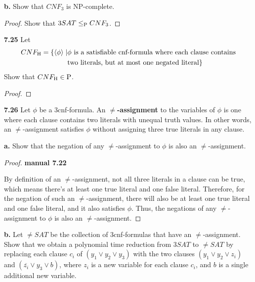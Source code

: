 \textbf{b.} Show that $CNF_3$ is NP-complete.
\begin{mdframed}
\begin{proof}
Show that $3SAT \leq_\P CNF_3$.
\end{proof}
\end{mdframed}

\textbf{7.25} Let 
\begin{align*}
CNF_\text{H} = \{ \desc{\phi} \mid & \phi \text{ is a satisfiable cnf-formula where each clause contains}  \\
& \text{two literals, but at most one negated literal}\}
\end{align*}
Show that $CNF_\text{H} \in \P$.

\begin{mdframed}
\begin{proof}

\end{proof}
\end{mdframed}

\label{lang:NEQSAT_NPC}
\textbf{7.26} Let $\phi$ be a 3cnf-formula. An \textbf{$\neq$-assignment} to the variables of $\phi$ is one where each clause contains two literals with unequal truth values. In other words, an $\neq$-assignment satisfies $\phi$ without assigning three true literals in any clause.

\textbf{a.} Show that the negation of any $\neq$-assignment to $\phi$ is also an $\neq$-assignment.
\begin{mdframed}
\begin{proof}
\textbf{manual 7.22}

By definition of an $\neq$-assignment, not all three literals in a clause can be true, which means there's at least one true literal and one false literal. Therefore, for the negation of such an $\neq$-assignment, there will also be at least one true literal and one false literal, and it also satisfies $\phi$. Thus, the negations of any $\neq$-assignment to $\phi$ is also an $\neq$-assignment.
\end{proof}
\end{mdframed}

\textbf{b.} Let $\neq SAT$ be the collection of 3cnf-formulas that have an $\neq$-assignment. Show that we obtain a polynomial time reduction from $3SAT$ to $\neq SAT$ by replacing each clause $c_i$ of $(y_1 \vee y_2 \vee y_3)$ with the two clauses $(y_1 \vee y_2 \vee z_i)$ and $(\overline{z_i} \vee y_3 \vee b)$, where $z_i$ is a new variable for each clause $c_i$, and $b$ is a single additional new variable.


